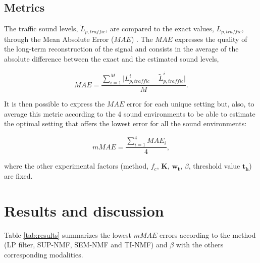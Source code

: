 \documentclass[review,5p,twocolumn,sort&compress,times]{elsarticle}
\begin{document}
\subsection{Metrics}

The traffic sound levels, $\tilde{L}_{p,traffic}$, are compared to the exact values, $L_{p,traffic}$, through the Mean Absolute Error ($MAE$) \cite{willmott2005advantages}. The $MAE$ expresses the quality of the long-term reconstruction of the signal and consists in the average of the absolute difference between the exact and the estimated sound levels, 

\begin{equation}
MAE = \frac{\sum_{i = 1}^{M} \vert L_{p,traffic}^i - \tilde{L}_{p,traffic}^i \vert}{M}.
\end{equation}

It is then possible to express the $MAE$ error for each unique setting but, also, to average this metric according to the 4 sound environments to be able to estimate the optimal setting that offers the lowest error for all the sound environments:

\begin{equation}
mMAE = \frac{\sum_{i = 1}^4 MAE_i}{4}, 
\end{equation}

where the other experimental factors (method, $f_c$, $\mathbf{K}$, $\mathbf{w_t}$, $\beta$, threshold value $\mathbf{t_h}$) are fixed. 


\section{Results and discussion}\label{part:results}

Table \ref{tab:results} summarizes the lowest $mMAE$ errors according to the method (LP filter, SUP-NMF, SEM-NMF and TI-NMF) and $\beta$ with the others corresponding modalities.
\end{document}
